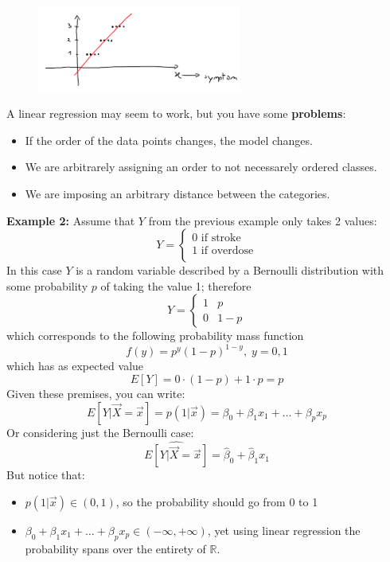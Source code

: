 \begin{figure}[h]
\caption{}
\centering
\includegraphics[width=0.6\textwidth]{LinearRegForClassification}
\label{}
\end{figure}


    A linear regression may seem to work, but you have some \textbf{problems}:
    \begin{itemize}
      \item If the order of the data points changes, the model changes.
      \item We are arbitrarely assigning an order to not necessarely ordered classes.
      \item We are imposing an arbitrary distance between the categories. 
    \end{itemize}

    \textbf{Example 2:} Assume that $Y$ from the previous example only takes 2 values:
    $$
    Y = \begin{cases}
          0 \text{ if stroke} \\
	      1 \text{ if overdose} \\
        \end{cases}
    $$
    In this case $Y$ is a random variable described by a Bernoulli distribution with some probability $p$ of taking the value 1; therefore 
    $$
    Y = \begin{cases}
          1 & p \\
	      0 & 1-p
        \end{cases}
    $$
    which corresponds to the following probability mass function
    $$f(y) = p^y(1-p)^{1-y}, \; y=0,1$$
    which has as expected value
    $$E[Y] = 0 \cdot (1-p) + 1 \cdot p = p$$
    Given these premises, you can write:
    $$E[Y|\vec{X} = \vec{x}] = p(1|\vec{x}) = \beta_0 + \beta_1 x_1 + \dots + \beta_px_p$$
    Or considering just the Bernoulli case:
    $$\hat{E[Y|\vec{X} = \vec{x}]} = \hat{\beta}_0 + \hat{\beta}_1x_1$$
    But notice that:
    \begin{itemize}
      \item $p(1|\vec{x}) \in (0, 1)$, so the probability should go from 0 to 1
      \item $\beta_0 + \beta_1 x_1 + \dots + \beta_px_p \in (-\infty, +\infty)$, yet using linear regression the probability spans over the entirety of $\mathbb{R}$.
    \end{itemize}
    
